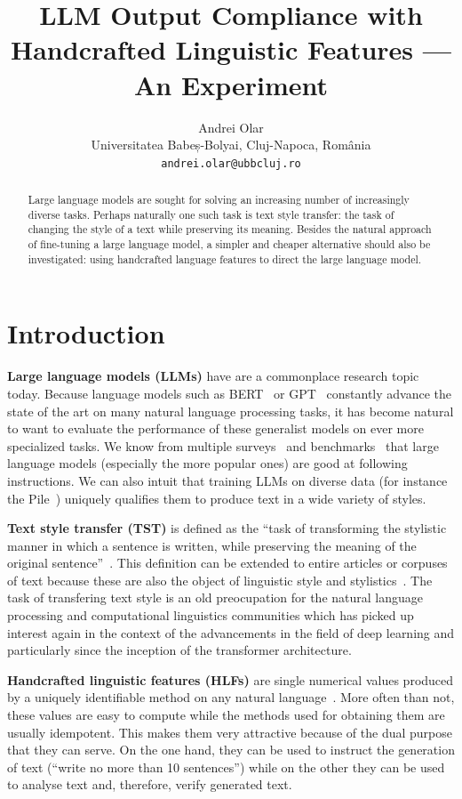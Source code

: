 \documentclass[11pt]{article}
\title{LLM Output Compliance with Handcrafted Linguistic Features --- An Experiment}
\author{Andrei Olar\\
Universitatea Babeș-Bolyai, Cluj-Napoca, România\\
\texttt{andrei.olar@ubbcluj.ro}\\}
\begin{document}
\maketitle
\begin{abstract}
    Large language models are sought for solving an increasing number of
    increasingly diverse tasks. Perhaps naturally one such task is text style
    transfer: the task of changing the style of a text while preserving its
    meaning. Besides the natural approach of fine-tuning a large language model,
    a simpler and cheaper alternative should also be investigated: using
    handcrafted language features to direct the large language model.
\end{abstract}


\section{Introduction}\label{introduction}

\textbf{Large language models (LLMs)} have are a commonplace research topic
today.
Because language models such as BERT~\cite{devlin2018bert} or
GPT~\cite{gpt-2018,gpt2-2019,gpt3-2020} constantly advance the state of the art
on many natural language processing tasks, it has become natural to want to
evaluate the performance of these generalist models on ever more specialized
tasks.
We know from multiple surveys~\cite{minaee2024llmsurvey,zhao2023survey} and
benchmarks~\cite{papcode2024hellaswag,chiang2024chatbot} that large language
models (especially the more popular ones) are good at following instructions.
We can also intuit that training LLMs on diverse data (for instance the
Pile~\cite{gao2020pile}) uniquely qualifies them to produce text in a wide
variety of styles.

\textbf{Text style transfer (TST)} is defined as the ``task of transforming the
stylistic manner in which a sentence is written, while preserving the meaning of
the original sentence''~\cite{tst-review-2021}.
This definition can be extended to entire articles or corpuses of text because
these are also the object of linguistic style and
stylistics~\cite{lugea2023stylistics}.
The task of transfering text style is an old preocupation for the natural
language processing and computational linguistics communities which has picked
up interest again in the context of the advancements in the field of deep
learning and particularly since the inception of the transformer architecture.

\textbf{Handcrafted linguistic features (HLFs)} are single numerical values
produced by a uniquely identifiable method on any natural
language~\cite{lftk-2023}.
More often than not, these values are easy to compute while the methods used for
obtaining them are usually idempotent.
This makes them very attractive because of the dual purpose that they can serve.
On the one hand, they can be used to instruct the generation of text (``write
no more than 10 sentences'') while on the other they can be used to analyse text
and, therefore, verify generated text.
\end{document}
